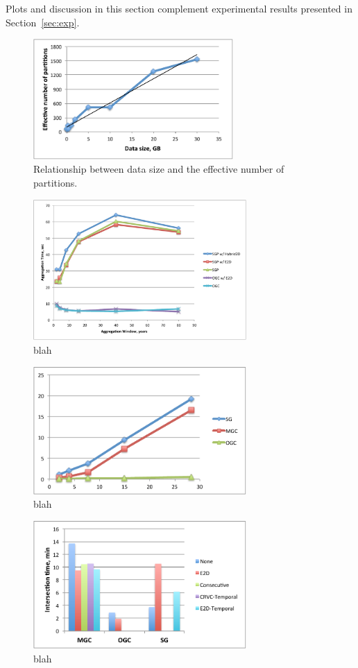 \appendix \label{sec:app}

Plots and discussion in this section complement experimental results
presented in Section~\ref{sec:exp}.

\begin{figure}
\includegraphics[width=3in]{figs/partsfit.pdf}
\caption{Relationship between data size and the effective number of
  partitions.}
\label{fig:partsfit}
\end{figure}

\begin{figure}
\includegraphics[width=3.2in]{figs/tgroupewidth_dblp.pdf}
\caption{blah}
\label{fig:tgroup_width_dblp}
\end{figure}

\begin{figure}
\includegraphics[width=3.2in]{figs/tgroupu_warm.pdf}
\caption{blah}
\label{fig:tgroupu_warm}
\end{figure}

\begin{figure}
\includegraphics[width=3.2in]{figs/tand_parts.pdf}
\caption{blah}
\label{fig:tand_parts}
\end{figure}

